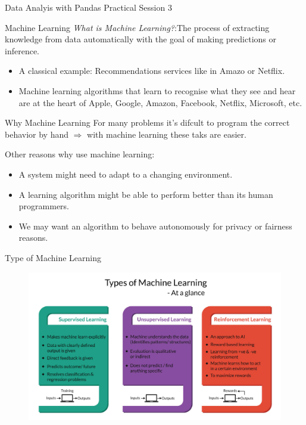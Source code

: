 \documentclass{bredelebeamer}
\begin{document}
\begin{frame}{Data Analyis with Pandas}
\centering
{\LARGE  Practical Session 3}
\end{frame}


\begin{frame}{Machine Learning}
\emph{What is Machine Learning?}:The process of extracting knowledge from data automatically with the goal of making predictions or inference.\\
\begin{itemize}
	\item A classical example: Recommendations services like in Amazo or Netflix.
	\item Machine learning algorithms that learn to recognise what they see and hear are at the heart of Apple, Google, Amazon, Facebook, Netflix, Microsoft, etc.
\end{itemize}
\end{frame}

\begin{frame}{Why Machine Learning}
For many problems  it’s difcult to program the correct behavior by hand  $\Rightarrow$ with machine learning these taks are easier.
\begin{exampleblock}{Other reasons why use machine learning:}
\begin{itemize}
	\item A system might need to adapt to a changing environment.
	\item A learning algorithm might be able to perform better than its human programmers.
	\item We may want an algorithm to behave autonomously for privacy or fairness reasons.
\end{itemize}
\end{exampleblock}

\end{frame}

\begin{frame}{Type of Machine Learning}
\begin{figure}[h]
\includegraphics[scale=0.2]{../image/ml_type.jpg}
\end{figure}
\end{frame}
\end{document}
